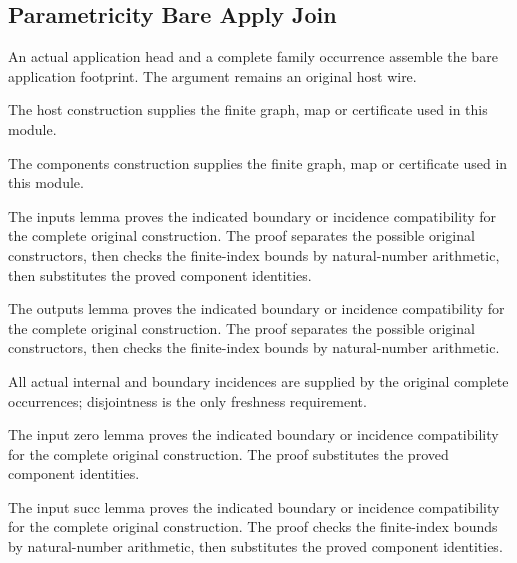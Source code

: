 \subsection{Parametricity Bare Apply Join}
An actual application head and a complete family occurrence assemble the
bare application footprint. The argument remains an original host wire.

The host construction supplies the finite graph, map or certificate used in this module.
\par{}

The components construction supplies the finite graph, map or certificate used in this module.
\par{}

The inputs lemma proves the indicated boundary or incidence compatibility for the complete original construction.
The proof separates the possible original constructors, then checks the finite-index bounds by natural-number arithmetic, then substitutes the proved component identities.
\par{}

The outputs lemma proves the indicated boundary or incidence compatibility for the complete original construction.
The proof separates the possible original constructors, then checks the finite-index bounds by natural-number arithmetic.
\par{}

All actual internal and boundary incidences are supplied by the original
complete occurrences; disjointness is the only freshness requirement.
\par{}

The input zero lemma proves the indicated boundary or incidence compatibility for the complete original construction.
The proof substitutes the proved component identities.
\par{}

The input succ lemma proves the indicated boundary or incidence compatibility for the complete original construction.
The proof checks the finite-index bounds by natural-number arithmetic, then substitutes the proved component identities.
\par{}

